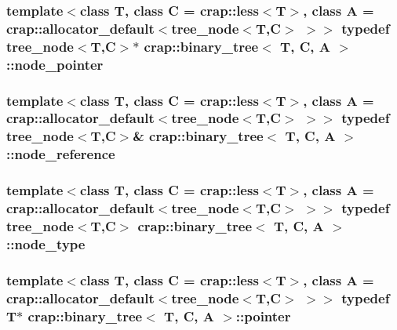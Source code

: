 \hypertarget{classcrap_1_1binary__tree_a04d7ea4aa1c1cc5bdd06cbdf3d537076}{
\subsubsection[{node\-\_\-pointer}]{\setlength{\rightskip}{0pt plus 5cm}template$<$class T, class C = crap\-::less$<$\-T$>$, class A = crap\-::allocator\-\_\-default$<$tree\-\_\-node$<$\-T,\-C$>$ $>$$>$ typedef {\bf tree\-\_\-node}$<$T,C$>$$\ast$ {\bf crap\-::binary\-\_\-tree}$<$ T, C, A $>$\-::{\bf node\-\_\-pointer}}}\label{classcrap_1_1binary__tree_a04d7ea4aa1c1cc5bdd06cbdf3d537076}
\hypertarget{classcrap_1_1binary__tree_a4ff11fd56b34d6ed682f63e6d3ac66b1}{
\subsubsection[{node\-\_\-reference}]{\setlength{\rightskip}{0pt plus 5cm}template$<$class T, class C = crap\-::less$<$\-T$>$, class A = crap\-::allocator\-\_\-default$<$tree\-\_\-node$<$\-T,\-C$>$ $>$$>$ typedef {\bf tree\-\_\-node}$<$T,C$>$\& {\bf crap\-::binary\-\_\-tree}$<$ T, C, A $>$\-::{\bf node\-\_\-reference}}}\label{classcrap_1_1binary__tree_a4ff11fd56b34d6ed682f63e6d3ac66b1}
\hypertarget{classcrap_1_1binary__tree_af74d1c1e3ed6600af0dcc454c7d41757}{
\subsubsection[{node\-\_\-type}]{\setlength{\rightskip}{0pt plus 5cm}template$<$class T, class C = crap\-::less$<$\-T$>$, class A = crap\-::allocator\-\_\-default$<$tree\-\_\-node$<$\-T,\-C$>$ $>$$>$ typedef {\bf tree\-\_\-node}$<$T,C$>$ {\bf crap\-::binary\-\_\-tree}$<$ T, C, A $>$\-::{\bf node\-\_\-type}}}\label{classcrap_1_1binary__tree_af74d1c1e3ed6600af0dcc454c7d41757}
\hypertarget{classcrap_1_1binary__tree_a27c6670d79fa1c757ce7c58025e582f8}{
\subsubsection[{pointer}]{\setlength{\rightskip}{0pt plus 5cm}template$<$class T, class C = crap\-::less$<$\-T$>$, class A = crap\-::allocator\-\_\-default$<$tree\-\_\-node$<$\-T,\-C$>$ $>$$>$ typedef T$\ast$ {\bf crap\-::binary\-\_\-tree}$<$ T, C, A $>$\-::{\bf pointer}}}\label{classcrap_1_1binary__tree_a27c6670d79fa1c757ce7c58025e582f8}
